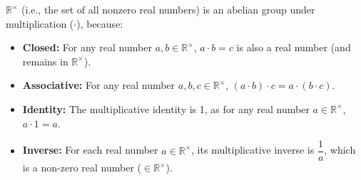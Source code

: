 \noindent $\mathbb{R}^\times$ (i.e., the set of all nonzero real numbers) is an abelian group under multiplication ($\cdot$), because:
\begin{itemize}
\item \textbf{Closed:} For any real number $a, b \in \mathbb{R}^\times$, $a \cdot b = c$ is also a real number (and remains in $\mathbb{R}^\times$).
\item \textbf{Associative:} For any real number $a, b, c \in \mathbb{R}^\times$, $(a \cdot b) \cdot c = a \cdot (b \cdot c)$.
\item \textbf{Identity:} The multiplicative identity is 1, as for any real number $a \in \mathbb{R}^\times$, $a \cdot 1 = a$.
\item \textbf{Inverse:} For each real number $a \in \mathbb{R}^\times$, its multiplicative inverse is $\dfrac{1}{a}$, which is a non-zero real number ($\in \mathbb{R}^{\times}$).
\end{itemize}